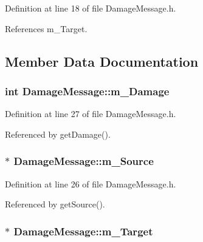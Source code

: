 Definition at line 18 of file Damage\+Message.\+h.



References m\+\_\+\+Target.



\subsection{Member Data Documentation}
\subsubsection[{\texorpdfstring{m\+\_\+\+Damage}{m_Damage}}]{\setlength{\rightskip}{0pt plus 5cm}int Damage\+Message\+::m\+\_\+\+Damage\hspace{0.3cm}{\ttfamily [private]}}\hypertarget{class_damage_message_a13210e9d91fcac17df553f1f3d029275}{}\label{class_damage_message_a13210e9d91fcac17df553f1f3d029275}


Definition at line 27 of file Damage\+Message.\+h.



Referenced by get\+Damage().

\subsubsection[{\texorpdfstring{m\+\_\+\+Source}{m_Source}}]{$\ast$ Damage\+Message\+::m\+\_\+\+Source\hspace{0.3cm}{\ttfamily [private]}}\hypertarget{class_damage_message_a6b0e3e9316ba34f864e93fa73b8cba67}{}\label{class_damage_message_a6b0e3e9316ba34f864e93fa73b8cba67}


Definition at line 26 of file Damage\+Message.\+h.



Referenced by get\+Source().

\subsubsection[{\texorpdfstring{m\+\_\+\+Target}{m_Target}}]{$\ast$ Damage\+Message\+::m\+\_\+\+Target\hspace{0.3cm}{\ttfamily [private]}}\hypertarget{class_damage_message_aa0b42b74f7243b8636d4b4b467f76d8e}{}\label{class_damage_message_aa0b42b74f7243b8636d4b4b467f76d8e}


